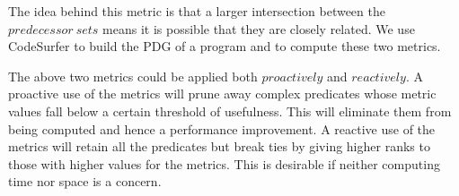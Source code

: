 The idea behind this metric is that a larger intersection between the $predecessor\ sets$ means it is possible that they are closely related.  We use CodeSurfer to build the PDG of a program and to compute these two metrics.

The above two metrics could be applied both $proactively$ and $reactively$.  A proactive use of the metrics will prune away complex predicates whose metric values fall below a certain threshold of usefulness.  This will eliminate them from being computed and hence a performance improvement.  A reactive use of the metrics will retain all the predicates but break ties by giving higher ranks to those with higher values for the metrics. This is desirable if neither computing time nor space is a concern.


